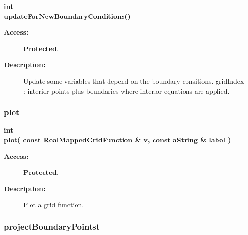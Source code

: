\begin{flushleft} \textbf{%
int      \\ 
\settowidth{\EllipticGridGeneratorIncludeArgIndent}{updateForNewBoundaryConditions(}%
updateForNewBoundaryConditions()
}\end{flushleft}
\begin{description}
\item[{\bf Access:}]  {\bf Protected}.
\item[{\bf Description:}] 
   Update some variables that depend on the boundary consitions.
 gridIndex : interior points plus boundaries where interior equations are applied.

\end{description}
\subsubsection{plot}
 
\begin{flushleft} \textbf{%
int  \\ 
\settowidth{\EllipticGridGeneratorIncludeArgIndent}{plot(}%
plot( const RealMappedGridFunction \& v, const aString \& label )
}\end{flushleft}
\begin{description}
\item[{\bf Access:}]  {\bf Protected}.
\item[{\bf Description:}] 
   Plot a grid function.
\end{description}
\subsubsection{projectBoundaryPointst}
 
